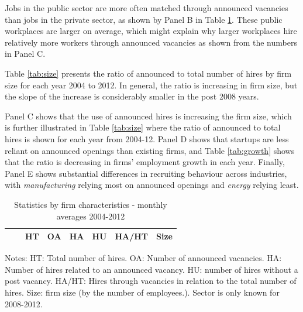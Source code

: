 \documentclass[11pt,article]{memoir}
\begin{document}
Jobs in the public sector are more often matched through announced vacancies than jobs in the private sector, as shown by Panel B in Table \ref{tab:maindesc}. These public workplaces are  larger on average, which might explain why larger workplaces hire relatively more workers through announced vacancies as shown from the numbers in Panel C. %

Table \ref{tab:size} presents the ratio of announced to total number of hires by firm size for each year 2004 to 2012. In general, the ratio is increasing in firm size, but the slope of the increase is considerably smaller in the post 2008 years. 

Panel C shows that the use of announced hires is increasing the firm size, which is further illustrated in Table \ref{tab:size} where the ratio of announced to total hires is shown for each year from 2004-12. 
Panel D shows that startups are less reliant on announced openings than existing firms, and Table \ref{tab:growth} shows that the ratio is decreasing in firms' employment growth in each year. Finally, Panel E shows substantial differences in recruiting behaviour across industries, with \emph{manufacturing} relying most on announced openings and \emph{energy} relying least.

\begin{table}[h!]
	\caption{Statistics by firm characteristics - monthly averages 2004-2012}
	\label{tab:maindesc}
	\begin{tabularx}{\linewidth}{cXcccccr}
	\toprule[1pt]
	&&HT&OA&HA&HU&HA/HT&Size\\
	\midrule
		
		\bottomrule[1pt]
	\end{tabularx}
	\begin{minipage}{\linewidth}
		\footnotesize{Notes: HT: Total number of hires. OA: Number of announced vacancies. HA: Number of hires related to an announced vacancy. HU: number of hires without a post vacancy. HA/HT: Hires through vacancies in relation to the total number of hires. Size: firm size (by the number of employees.). Sector is only known for 2008-2012.}
	\end{minipage}
\end{table}
\end{document}
